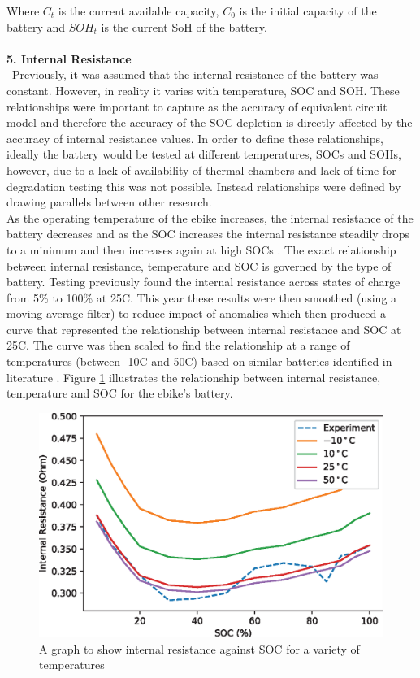 \documentclass[a4paper, 10pt]{article}
\numberwithin{equation}{section}
\begin{document}
Where $C_{t}$ is the current available capacity, $C_{0}$ is the initial capacity of the battery and $SOH_{t}$ is the current SoH of the battery.
\\
\\
\textbf{5. Internal Resistance}
\\
\
Previously, it was assumed that the internal resistance of the battery was constant. However, in reality it varies with temperature, SOC and SOH. These relationships were important to capture as the accuracy of equivalent circuit model and therefore the accuracy of the SOC depletion is directly affected by the accuracy of internal resistance values. In order to define these relationships, ideally the battery would be tested at different temperatures, SOCs and SOHs, however, due to a lack of availability of thermal chambers and lack of time for degradation testing this was not possible. Instead relationships were defined by drawing parallels between other research. 
\\
As the operating temperature of the ebike increases, the internal resistance of the battery decreases and as the SOC increases the internal resistance steadily drops to a minimum and then increases again at high SOCs \cite{report:IR_temp_soc}. The exact relationship between internal resistance, temperature and SOC is governed by the type of battery. Testing previously found the internal resistance across states of charge from 5\% to 100\% at 25\degree C. This year these results were then smoothed (using a moving average filter) to reduce impact of anomalies which then produced a curve that represented the relationship between internal resistance and SOC at 25\degree C. The curve was then scaled to find the relationship at a range of temperatures (between -10\degree C and 50\degree C) based on similar batteries identified in literature \cite{report:IR_temp_soc}. Figure \ref{fig:IR_SOC_temp} illustrates the relationship between internal resistance, temperature and SOC for the ebike's battery.

\begin{figure}[H]
    \centering
    \includegraphics[width=0.5\linewidth]{images/IR_temp.eps}
    \caption{A graph to show internal resistance against SOC for a variety of temperatures}
    \label{fig:IR_SOC_temp}
\end{figure}
\end{document}
